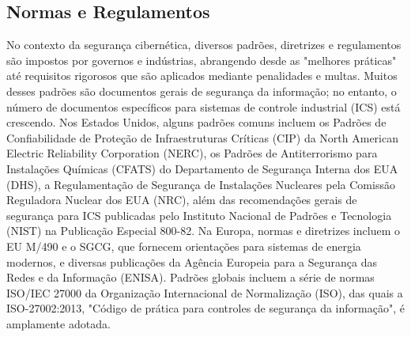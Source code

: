 


\subsection{Normas e Regulamentos}

No contexto da segurança cibernética, diversos padrões, diretrizes e regulamentos são impostos por governos e indústrias, abrangendo desde as "melhores práticas" até requisitos rigorosos que são aplicados mediante penalidades e multas. Muitos desses padrões são documentos gerais de segurança da informação; no entanto, o número de documentos específicos para sistemas de controle industrial (ICS) está crescendo. Nos Estados Unidos, alguns padrões comuns incluem os Padrões de Confiabilidade de Proteção de Infraestruturas Críticas (CIP) da North American Electric Reliability Corporation (NERC), os Padrões de Antiterrorismo para Instalações Químicas (CFATS) do Departamento de Segurança Interna dos EUA (DHS), a Regulamentação de Segurança de Instalações Nucleares pela Comissão Reguladora Nuclear dos EUA (NRC), além das recomendações gerais de segurança para ICS publicadas pelo Instituto Nacional de Padrões e Tecnologia (NIST) na Publicação Especial 800-82. Na Europa, normas e diretrizes incluem o EU M/490 e o SGCG, que fornecem orientações para sistemas de energia modernos, e diversas publicações da Agência Europeia para a Segurança das Redes e da Informação (ENISA). Padrões globais incluem a série de normas ISO/IEC 27000 da Organização Internacional de Normalização (ISO), das quais a ISO-27002:2013, "Código de prática para controles de segurança da informação", é amplamente adotada.

